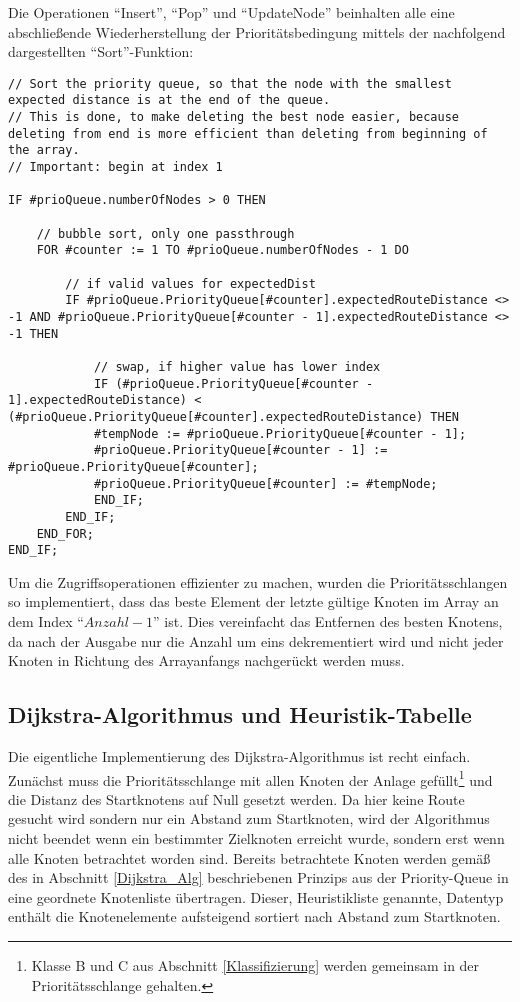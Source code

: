 			Die Operationen "`Insert"', "`Pop"' und "`UpdateNode"' beinhalten alle eine abschließende Wiederherstellung  der Prioritätsbedingung mittels der nachfolgend dargestellten "`Sort"'-Funktion:
			
			\begin{lstlisting}[frame=single]
// Sort the priority queue, so that the node with the smallest expected distance is at the end of the queue.
// This is done, to make deleting the best node easier, because deleting from end is more efficient than deleting from beginning of the array.
// Important: begin at index 1

IF #prioQueue.numberOfNodes > 0 THEN

	// bubble sort, only one passthrough
	FOR #counter := 1 TO #prioQueue.numberOfNodes - 1 DO
	
		// if valid values for expectedDist
		IF #prioQueue.PriorityQueue[#counter].expectedRouteDistance <> -1 AND #prioQueue.PriorityQueue[#counter - 1].expectedRouteDistance <> -1 THEN
		
			// swap, if higher value has lower index
			IF (#prioQueue.PriorityQueue[#counter - 1].expectedRouteDistance) < (#prioQueue.PriorityQueue[#counter].expectedRouteDistance) THEN
			#tempNode := #prioQueue.PriorityQueue[#counter - 1];
			#prioQueue.PriorityQueue[#counter - 1] := #prioQueue.PriorityQueue[#counter];
			#prioQueue.PriorityQueue[#counter] := #tempNode;
			END_IF;
		END_IF;
	END_FOR;
END_IF;\end{lstlisting}
			
			Um die Zugriffsoperationen effizienter zu machen, wurden die Prioritätsschlangen so implementiert, dass das beste Element der letzte gültige Knoten im Array an dem Index "`$Anzahl - 1$"' ist. Dies vereinfacht das Entfernen des besten Knotens, da nach der Ausgabe nur die Anzahl um eins dekrementiert wird und nicht jeder Knoten in Richtung des Arrayanfangs nachgerückt werden muss.
			
		\subsection{Dijkstra-Algorithmus und Heuristik-Tabelle}
			
			Die eigentliche Implementierung des Dijkstra-Algorithmus ist recht einfach. Zunächst muss die Prioritätsschlange mit allen Knoten der Anlage gefüllt\footnote{Klasse B und C aus Abschnitt \ref{Klassifizierung} werden gemeinsam in der Prioritätsschlange gehalten.} und die Distanz des Startknotens auf Null gesetzt werden. 
			Da hier keine Route gesucht wird sondern nur ein Abstand zum Startknoten, wird der Algorithmus nicht beendet wenn ein bestimmter Zielknoten erreicht wurde, sondern erst wenn alle Knoten betrachtet worden sind. Bereits betrachtete Knoten werden gemäß des in Abschnitt \ref{Dijkstra_Alg} beschriebenen Prinzips aus der Priority-Queue in eine geordnete Knotenliste übertragen. Dieser, Heuristikliste genannte, Datentyp enthält die Knotenelemente aufsteigend sortiert nach Abstand zum Startknoten.
			
